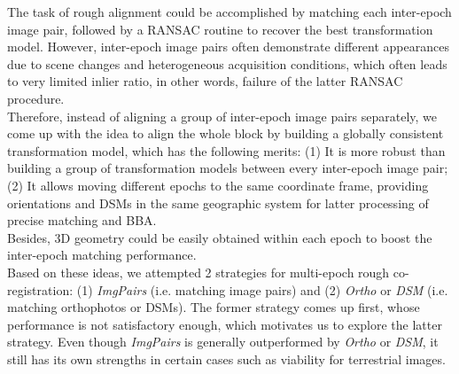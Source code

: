 The task of rough alignment could be accomplished by matching each inter-epoch image pair, followed by a RANSAC routine to recover the best transformation model.
However, inter-epoch image pairs often demonstrate different appearances due to scene changes and heterogeneous acquisition conditions, which often leads to very limited inlier ratio, in other words, failure of the latter RANSAC procedure.\\
Therefore, instead of aligning a group of inter-epoch image pairs separately, we come up with the idea to align the whole block by building a globally consistent transformation model, which has the following merits: (1) It is more robust than building a group of transformation models between every inter-epoch image pair; (2) It allows moving different epochs to the same coordinate frame, providing orientations and \ac{DSM}s in the same geographic system for latter processing of precise matching and \ac{BBA}.\\
Besides, 3D geometry could be easily obtained within each epoch to boost the inter-epoch matching performance.\\
Based on these ideas, we attempted 2 strategies for multi-epoch rough co-registration: (1) \textit{ImgPairs} (i.e. matching image pairs) and (2) \textit{Ortho} or \textit{DSM} (i.e. matching orthophotos or \ac{DSM}s). The former strategy comes up first, whose performance is not satisfactory enough, which motivates us to explore the latter strategy. Even though \textit{ImgPairs} is generally outperformed by \textit{Ortho} or \textit{DSM}, it still has its own strengths in certain cases such as viability for terrestrial images.\\
